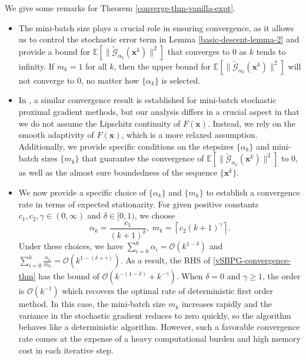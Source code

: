 \documentclass[twoside,11pt]{article}
\newcommand{\ceil}[1]{\left\lceil#1\right\rceil}
\newcommand{\E}{\mathbb{E}}
\newcommand{\cG}{\mathcal G}
\def\vx{{\bm{x}}}
\begin{document}
\begin{remark}
We give some remarks for Theorem \ref{converge-thm-vanilla-expt}.
\begin{itemize} 
\item[1.] The mini-batch size plays a crucial role in ensuring convergence, as it allows us to control the stochastic error term in Lemma \ref{basic-descent-lemma-2} and provide a bound for $\E[\|\widetilde{\cG}_{\alpha_k}({\vx^k})\|^2]$ that converges to $0$ as $k$ tends to infinity. If $m_k=1$ for all $k$, then the upper bound for $\E[\|\widetilde{\cG}_{\alpha_k}({\vx^k})\|^2]$ will not converge to $0$, no matter how $\{\alpha_k\}$ is selected. 
\item[2.] In \citep{ghadimi2016mini}, a similar convergence result is established for mini-batch stochastic proximal gradient methods, but our analysis differs in a crucial aspect in that we do not assume the Lipschitz continuity of $F(\vx)$. Instead, we rely on the smooth adaptivity of $F(\vx)$, which is a more relaxed assumption. Additionally, we provide specific conditions on the stepsizes $\{\alpha_k\}$ and mini-batch sizes $\{m_k\}$ that guarantee the convergence of $\E[\|\widetilde{\cG}_{\alpha_k}({\vx^k})\|^2]$ to $0$, as well as the almost sure boundedness of the sequence $\{\vx^k\}$.
\item[3.] {We now provide a specific choice of $\{\alpha_k\}$ and $\{m_k\}$ to establish a convergence rate in terms of expected stationarity. For given positive constants $c_1,c_2,\gamma\in(0,\infty)$ and $\delta\in[0,1)$, we choose
\[
\alpha_k=\frac{c_1}{(k+1)^\delta},\;m_k=\ceil{c_2(k+1)^\gamma}.
\]
Under these choices, we have $\sum_{i=0}^k\alpha_i=\mathcal{O}(k^{1-\delta})$ and $\sum_{i=0}^k\frac{\alpha_k}{m_k}=\mathcal{O}(k^{1-(\delta+\gamma)})$. As a result, the RHS of \eqref{vSBPG-convergence-thm} has the bound of $\mathcal{O}(k^{-(1-\delta)}+k^{-\gamma})$. When $\delta=0$ and $\gamma\geq1$, the order is $\mathcal{O}(k^{-1})$ which recovers the optimal rate of deterministic first order method. In this case, the mini-batch size $m_k$ increases rapidly and the variance in the stochastic gradient reduces to zero quickly, so the algorithm behaves like a deterministic algorithm. However, such a favorable convergence rate comes at the expense of a heavy computational burden and high memory cost in each iterative step.}
\end{itemize}
\label{Vanilla-convergence-expt-remark}
\end{remark}
\end{document}
